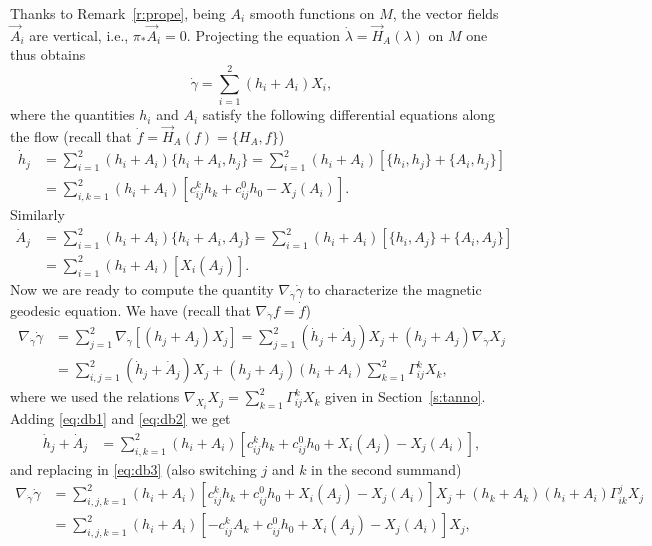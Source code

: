 \documentclass{amsart}
\theoremstyle{plain}
\theoremstyle{definition}
\theoremstyle{remark}
\begin{document}
Thanks to Remark~\ref{r:prope}, being $A_{i}$  smooth functions on $M$, the vector fields $\vec A_{i}$ are vertical, i.e., $\pi_{*}\vec A_{i} =0$. Projecting the equation  $\dot \lambda=\vec H_{A}(\lambda)$ on $M$ one thus obtains
$$\dot \gamma=\sum_{i=1}^{2}(h_{i}+A_{i})X_{i},$$
where the quantities $h_{i}$ and $A_{i}$ satisfy the following differential equations along the flow (recall that $\dot f=\vec H_{A}(f)=\{H_{A},f\}$)
\begin{align} \label{eq:db1}
\dot h_{j}&=\sum_{i=1}^{2}(h_{i}+A_{i})\{h_{i}+A_{i},h_{j}\}=\sum_{i=1}^{2}(h_{i}+A_{i})[\{h_{i},h_{j}\}+\{A_{i},h_{j}\}]\\
&=\sum_{i,k=1}^{2}(h_{i}+A_{i})[c_{ij}^{k} h_{k}+c_{ij}^{0} h_{0}-X_{j}(A_{i})]. \nonumber
\end{align}
Similarly
\begin{align}\label{eq:db2}
\dot A_{j}&=\sum_{i=1}^{2}(h_{i}+A_{i})\{h_{i}+A_{i},A_{j}\}=\sum_{i=1}^{2}(h_{i}+A_{i})[\{h_{i},A_{j}\}+\{A_{i},A_{j}\}]\\
&=\sum_{i=1}^{2}(h_{i}+A_{i})[X_{i}(A_{j})]. \nonumber
\end{align}
Now we are ready to compute the quantity $\nabla_{\dot \gamma}\dot \gamma$
to characterize the magnetic geodesic equation. We have (recall that $\nabla_{\dot \gamma} f=\dot f$)
\begin{align}\label{eq:db3}
\nabla_{\dot \gamma}\dot \gamma&=\sum_{j=1}^{2}\nabla_{\dot \gamma}[(h_{j}+A_{j})X_{j}]=\sum_{j=1}^{2}(\dot h_{j}+\dot A_{j})X_{j} +(h_{j}+A_{j})\nabla_{\dot \gamma}X_{j}\\
&=\sum_{i,j=1}^{2}(\dot h_{j}+\dot A_{j})X_{j} +(h_{j}+A_{j})(h_{i}+A_{i})\sum_{k=1}^{2}\Gamma_{ij}^{k}X_{k}, \nonumber
\end{align}
where we used the relations $\nabla_{X_{i}}X_{j}=\sum_{k=1}^2\Gamma_{ij}^{k}X_{k}$ given in Section~\ref{s:tanno}. Adding \eqref{eq:db1} and \eqref{eq:db2}
we get
\begin{align*}
\dot h_{j}+\dot A_{j}&=\sum_{i,k=1}^{2}(h_{i}+A_{i})[c_{ij}^{k} h_{k}+ c_{ij}^{0} h_{0}+X_{i}(A_{j})-X_{j}(A_{i})],
\end{align*}
and replacing in \eqref{eq:db3} (also switching $j$ and $k$ in the second summand)
\begin{align*}
\nabla_{\dot \gamma}\dot \gamma
&=\sum_{i,j,k=1}^{2}(h_{i}+A_{i})[c_{ij}^{k} h_{k}+ c_{ij}^{0} h_{0}+X_{i}(A_{j})-X_{j}(A_{i})]X_{j} +(h_{k}+A_{k})(h_{i}+A_{i})\Gamma_{ik}^{j}X_{j}\\
&=\sum_{i,j,k=1}^{2}(h_{i}+A_{i})[-c_{ij}^{k} A_{k}+ c_{ij}^{0} h_{0}+X_{i}(A_{j})-X_{j}(A_{i})]X_{j} ,
\end{align*}
\end{document}
